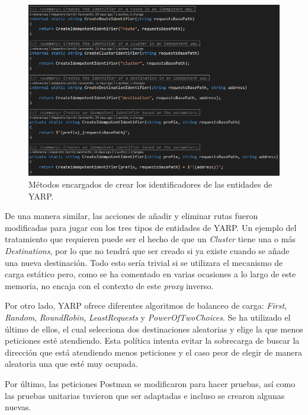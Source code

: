 \documentclass[11pt,spanish,listoffigures]{tfgetsinf}
\begin{document}
\begin{figure}[ht]
\centering
\includegraphics[width=1\textwidth]{imagenes/creacionIdentificadores}
\caption{Métodos encargados de crear los identificadores de las entidades de YARP.}
	\label{creacionIdentificadores}
\end{figure}

De una manera similar, las acciones de añadir y eliminar rutas fueron modificadas para jugar con los tres tipos de entidades de YARP. Un ejemplo del tratamiento que requieren puede ser el hecho de que un \emph{Cluster} tiene una o más \emph{Destinations}, por lo que no tendrá que ser creado si ya existe cuando se añade una nueva destinación. Todo esto sería trivial si se utilizara el mecanismo de carga estático pero, como se ha comentado en varias ocasiones a lo largo de este memoria, no encaja con el contexto de este \emph{proxy} inverso.

Por otro lado, YARP ofrece diferentes algoritmos de balanceo de carga: \emph{First}, \emph{Random}, \emph{RoundRobin}, \emph{LeastRequests} y \emph{PowerOfTwoChoices}. Se ha utilizado el último de ellos, el cual selecciona dos destinaciones aleatorias y elige la que menos peticiones esté atendiendo. Esta política intenta evitar la sobrecarga de buscar la dirección que está atendiendo menos peticiones y el caso peor de elegir de manera aleatoria una que esté muy ocupada.

Por último, las peticiones Postman se modificaron para hacer pruebas, así como las pruebas unitarias tuvieron que ser adaptadas e incluso se crearon algunas nuevas.

\end{document}
